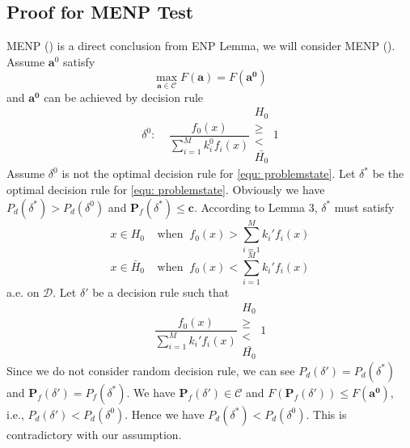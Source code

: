 \documentclass[12pt,journal,a4paper,twoside,onecolumn]{IEEEtran}
\newcommand{\rmnum}[1]{\romannumeral #1}
\begin{document}
\begin{spacing}{2.5}
\subsection{Proof for MENP Test}
MENP (\rmnum{1}) is a direct conclusion from ENP Lemma, we will consider MENP (\rmnum{2}). Assume $\mathbf{a}^0$ satisfy
\[
\max_{\mathbf{a}\in\mathcal{C}} F(\mathbf{a}) = F(\mathbf{a^0})
\]
and $\mathbf{a^0}$ can be achieved by decision rule
\[
\delta^0:\;\;\;\;\frac{f_0(x)}{\sum_{i=1}^{M}k_i^0f_i(x)} \substack{H_0 \\ \geq \\ < \\ \bar{H_0}} 1
\]
Assume $\delta^0$ is not the optimal decision rule for \eqref{equ: problemstate}. Let $\delta^\ast$ be the optimal decision rule for \eqref{equ: problemstate}. Obviously we have $P_d(\delta^\ast) > P_d (\delta^0)$ and $\mathbf{P}_f(\delta^\ast) \leq \mathbf{c}$.  
According to Lemma 3, $\delta^\ast$ must satisfy 
\[
x \in H_0\;\;\;\;\text{when}\;\;f_0(x) > \sum_{i=1}^{M}k_i'f_i(x)
\]
\[
x \in \bar{H}_0\;\;\;\;\text{when}\;\;f_0(x) < \sum_{i=1}^{M}k_i'f_i(x)
\]
a.e. on $\mathcal{D}$. Let $\delta'$ be a decision rule such that
\[
\frac{f_0(x)}{\sum_{i=1}^{M}k_i'f_i(x)}\substack{H_0 \\ \geq \\ < \\ \bar{H_0}} 1
\]
Since we do not consider random decision rule, we can see $P_d(\delta') = P_d(\delta^\ast)$ and $\mathbf{P}_f(\delta') = P_f(\delta^\ast)$. We have $\mathbf{P}_f(\delta') \in \mathcal{C}$ and $F(\mathbf{P}_f(\delta')) \leq F(\mathbf{a^0})$, i.e., $P_d(\delta') < P_d(\delta^0)$. Hence we have $P_d(\delta^\ast) < P_d(\delta^0)$. This is contradictory with our assumption.


\end{spacing}
\end{document}
